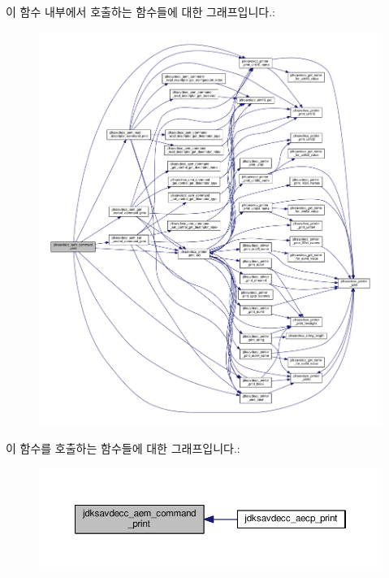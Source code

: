 이 함수 내부에서 호출하는 함수들에 대한 그래프입니다.\+:
\nopagebreak
\begin{figure}[H]
\begin{center}
\leavevmode
\includegraphics[width=350pt]{group__aem__print_gae1e2e8e45252cd16a6f95d590870a6ea_cgraph}
\end{center}
\end{figure}




이 함수를 호출하는 함수들에 대한 그래프입니다.\+:
\nopagebreak
\begin{figure}[H]
\begin{center}
\leavevmode
\includegraphics[width=350pt]{group__aem__print_gae1e2e8e45252cd16a6f95d590870a6ea_icgraph}
\end{center}
\end{figure}


